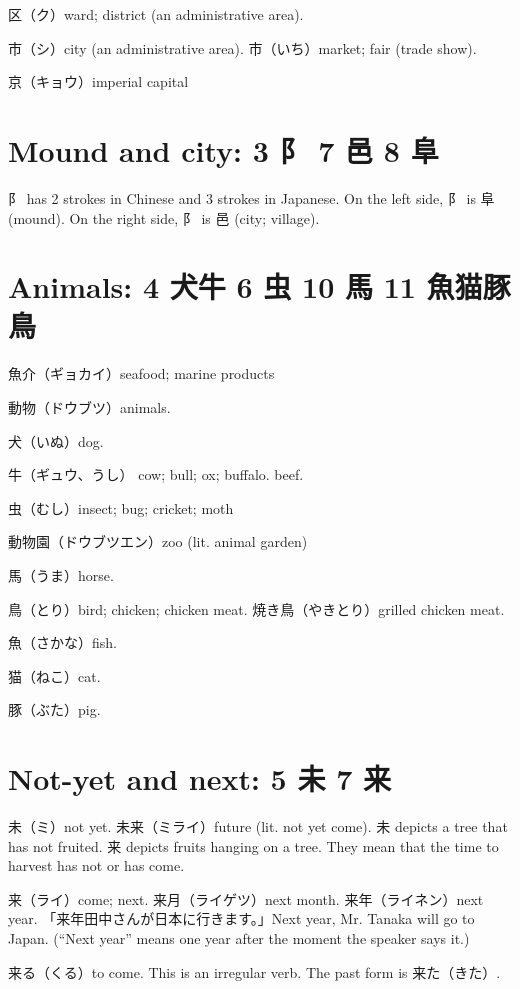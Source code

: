 区（ク）ward; district (an administrative area).

市（シ）city (an administrative area).
市（いち）market; fair (trade show).

京（キョウ）imperial capital

\section{Mound and city: 3 阝 7 邑 8 阜}

阝 has 2 strokes in Chinese and 3 strokes in Japanese.
On the left side, 阝 is 阜 (mound).
On the right side, 阝 is 邑 (city; village).

\section{Animals: 4 犬牛 6 虫 10 馬 11 魚猫豚鳥}

魚介（ギョカイ）seafood; marine products

動物（ドウブツ）animals.

犬（いぬ）dog.

牛（ギュウ、うし）
cow; bull; ox; buffalo.
beef.

虫（むし）insect; bug; cricket; moth

動物園（ドウブツエン）zoo (lit. animal garden)

馬（うま）horse.

鳥（とり）bird; chicken; chicken meat.
焼き鳥（やきとり）grilled chicken meat.

魚（さかな）fish.

猫（ねこ）cat.

豚（ぶた）pig.

\section{Not-yet and next: 5 未 7 来}

未（ミ）not yet.
未来（ミライ）future (lit. not yet come).
未 depicts a tree that has not fruited.
来 depicts fruits hanging on a tree.
They mean that the time to harvest has not or has come.

来（ライ）come; next.
来月（ライゲツ）next month.
来年（ライネン）next year.
「来年田中さんが日本に行きます。」Next year, Mr. Tanaka will go to Japan.
(``Next year'' means one year after the moment the speaker says it.)

来る（くる）to come.
This is an irregular verb.
The past form is 来た（きた）.
